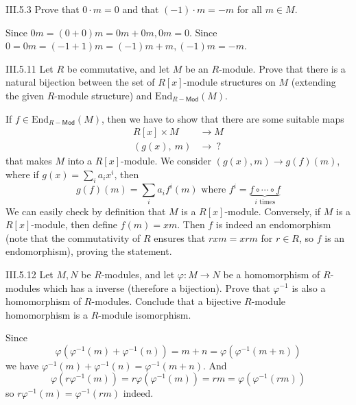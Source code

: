 \begin{problem}{III.5.3}
Prove that $0\cdot m = 0$ and that $(-1) \cdot m = -m$ for all $m \in M$. 
\end{problem}
\begin{pf}
Since $0m = (0+0)m = 0m + 0m, 0m = 0$. Since $0 = 0m = (-1+1)m = (-1)m+m, (-1)m = -m$.
\end{pf}

\begin{problem}{III.5.11}
Let $R$ be commutative, and let $M$ be an $R$-module. Prove that there is a natural bijection between the set of $R[x]$-module structures on $M$ (extending the given $R$-module structure) and $\text{End}_{R-\mathsf{Mod}}(M)$.
\end{problem}
\begin{pf}
If $f \in \text{End}_{R-\textsf{Mod}}(M)$, then we have to show that there are some suitable maps
\begin{align*}
R[x] \times M &\to M \\
(g(x), \:m) &\to \: ?
\end{align*}
that makes $M$ into a $R[x]$-module. We consider $(g(x),m) \to g(f)(m)$, where if $g(x) = \sum_i a_i x^i$, then
\[
g(f)(m) = \sum_{i} a_i f^i(m) \text{ where } f^i = \underbrace{f \circ \cdots \circ f}_{i\text{ times}}
\]
We can easily check by definition that $M$ is a $R[x]$-module. Conversely, if $M$ is a $R[x]$-module, then define $f(m) = xm$. Then $f$ is indeed an endomorphism (note that the commutativity of $R$ ensures that $rxm = xrm$ for $r \in R$, so $f$ is an endomorphism), proving the statement.
\end{pf}

\begin{problem}{III.5.12}
Let $M,N$ be $R$-modules, and let $\varphi:M \to N$ be a homomorphism of $R$-modules which has a inverse (therefore a bijection). Prove that $\varphi^{-1}$ is also a homomorphism of $R$-modules. Conclude that a bijective $R$-module homomorphism is a $R$-module isomorphism.
\end{problem}
\begin{pf}
Since
\[
\varphi(\varphi^{-1}(m) + \varphi^{-1}(n)) = m + n = \varphi(\varphi^{-1}(m + n))
\]
we have $\varphi^{-1}(m) + \varphi^{-1}(n) = \varphi^{-1}(m + n)$. And
\[
\varphi(r\varphi^{-1}(m)) = r\varphi(\varphi^{-1}(m)) = rm = \varphi(\varphi^{-1}(rm))
\]
so $r\varphi^{-1}(m) = \varphi^{-1}(rm)$ indeed. 
\end{pf}


